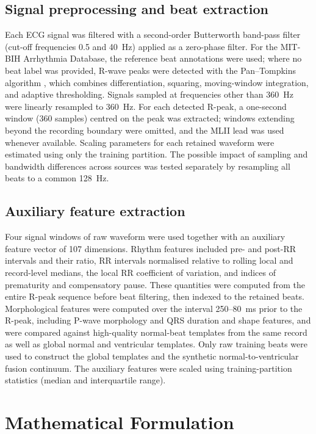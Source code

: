 \subsection{Signal preprocessing and beat extraction}

Each ECG signal was filtered with a second-order Butterworth band-pass
filter (cut-off frequencies 0.5 and 40~Hz) applied as a zero-phase filter.
For the MIT-BIH Arrhythmia Database, the reference beat annotations were
used; where no beat label was provided, R-wave peaks were detected with the
Pan--Tompkins algorithm \cite{pan1985qrs}, which combines differentiation,
squaring, moving-window integration, and adaptive thresholding.
Signals sampled at frequencies other than 360~Hz were linearly resampled to
360~Hz. For each detected R-peak, a one-second window (360 samples) centred
on the peak was extracted; windows extending beyond the recording boundary
were omitted, and the MLII lead was used whenever available. Scaling
parameters for each retained waveform were estimated using only the
training partition. The possible impact of sampling and bandwidth
differences across sources was tested separately by resampling all beats to
a common 128~Hz.

\subsection{Auxiliary feature extraction}

Four signal windows of raw waveform were used together with an auxiliary
feature vector of 107 dimensions. Rhythm features included pre- and
post-RR intervals and their ratio, RR intervals normalised relative to
rolling local and record-level medians, the local RR coefficient of
variation, and indices of prematurity and compensatory pause. These
quantities were computed from the entire R-peak sequence before beat
filtering, then indexed to the retained beats. Morphological features were
computed over the interval 250--80~ms prior to the R-peak, including P-wave
morphology and QRS duration and shape features, and were compared against
high-quality normal-beat templates from the same record as well as global
normal and ventricular templates. Only raw training beats were used to
construct the global templates and the synthetic normal-to-ventricular
fusion continuum. The auxiliary features were scaled using training-partition
statistics (median and interquartile range).


\section{Mathematical Formulation}
\label{sec:math}

